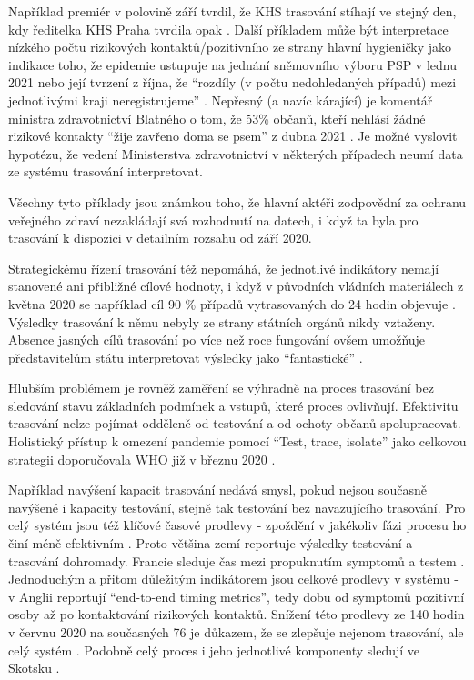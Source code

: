 Například premiér v polovině září tvrdil, že KHS trasování stíhají ve stejný den, kdy ředitelka KHS Praha tvrdila opak \cite{tr_denik_cz}. Další příkladem může být interpretace nízkého počtu rizikových kontaktů/pozitivního ze strany hlavní hygieničky jako indikace toho, že epidemie ustupuje na jednání sněmovního výboru PSP v lednu 2021 \cite{tr_denik_n} nebo její tvrzení z října, že “rozdíly (v počtu nedohledaných případů) mezi jednotlivými kraji neregistrujeme” \cite{tr_novinky_cz}. Nepřesný (a navíc kárající) je komentář ministra zdravotnictví Blatného o tom, že 53\% občanů, kteří nehlásí žádné rizikové kontakty “žije zavřeno doma se psem” z dubna 2021 \cite{tr_tvidnes_cz}. Je možné vyslovit hypotézu, že vedení Ministerstva zdravotnictví v některých případech neumí data ze systému trasování interpretovat. 

Všechny tyto příklady jsou známkou toho, že hlavní aktéři zodpovědní za ochranu veřejného zdraví nezakládají svá rozhodnutí na datech, i když ta byla pro trasování k dispozici v detailním rozsahu od září 2020.

Strategickému řízení trasování též nepomáhá, že jednotlivé indikátory nemají stanovené ani přibližné cílové hodnoty, i když v původních vládních materiálech z května 2020 se například cíl 90 \% případů vytrasovaných do 24 hodin objevuje \cite{tr_vlada01}. Výsledky trasování k němu nebyly ze strany státních orgánů nikdy vztaženy. Absence jasných cílů trasování po více než roce fungování ovšem umožňuje představitelům státu interpretovat výsledky jako “fantastické” \cite{tr_vlada02}.

Hlubším problémem je rovněž zaměření se výhradně na proces trasování bez sledování stavu základních podmínek a vstupů, které proces ovlivňují. Efektivitu trasování nelze pojímat odděleně od testování a od ochoty občanů spolupracovat. Holistický přístup k omezení pandemie pomocí “Test, trace, isolate” jako celkovou strategii doporučovala WHO již v březnu 2020 \cite{tr_WHO_02}.

Například navýšení kapacit trasování nedává smysl, pokud nejsou současně navýšené i kapacity testování, stejně tak testování bez navazujícího trasování. Pro celý systém jsou též klíčové časové prodlevy - zpoždění v jakékoliv fázi procesu ho činí méně efektivním \cite{tr_systems_successful_2020}. Proto většina zemí reportuje výsledky testování a trasování dohromady. Francie sleduje čas mezi propuknutím symptomů a testem \cite{tr_france}. Jednoduchým a přitom důležitým indikátorem jsou celkové prodlevy v systému - v Anglii reportují “end-to-end timing metrics”, tedy dobu od symptomů pozitivní osoby až po kontaktování rizikových kontaktů. Snížení této prodlevy ze 140 hodin v červnu 2020 na současných 76 je důkazem, že se zlepšuje nejenom trasování, ale celý systém \cite{tr_gov_uk01}. Podobně celý proces i jeho jednotlivé komponenty sledují ve Skotsku \cite{tr_scotland}.

